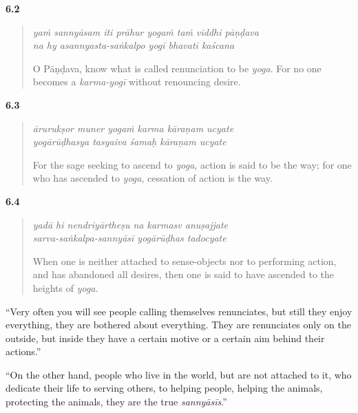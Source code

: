 \par\noindent\textbf{6.2}\par
\begin{verse}
\textit{yaṁ sannyāsam iti prāhur yogaṁ taṁ viddhi pāṇḍava} \\
\textit{na hy asannyasta-saṅkalpo yogī bhavati kaścana}

\noindent O Pāṇḍava, know what is called renunciation to be \textit{yoga}. For no one becomes a \textit{karma-yogī} without renouncing desire.
\end{verse}
\par



\par\noindent\textbf{6.3}\par
\begin{verse}
\textit{ārurukṣor muner yogaṁ karma kāraṇam ucyate} \\
\textit{yogārūḍhasya tasyaiva śamaḥ kāraṇam ucyate}

\noindent For the sage seeking to ascend to \textit{yoga}, action is said to be the way; for one who has ascended to \textit{yoga}, cessation of action is the way.
\end{verse}
\par



\par\noindent\textbf{6.4}\par
\begin{verse}
\textit{yadā hi nendriyārtheṣu na karmasv anuṣajjate} \\
\textit{sarva-saṅkalpa-sannyāsī yogārūḍhas tadocyate}

\noindent When one is neither attached to sense-objects nor to performing action, and has abandoned all desires, then one is said to have ascended to the heights of \textit{yoga}.
\end{verse}
\par


\enquote{Very often you will see people calling themselves renunciates, but still they enjoy everything, they are bothered about everything. They are renunciates only on the outside, but inside they have a certain motive or a certain aim behind their actions.}

\enquote{On the other hand, people who live in the world, but are not attached to it, who dedicate their life to serving others, to helping people, helping the animals, protecting the animals, they are the true \textit{sannyāsīs}.}

